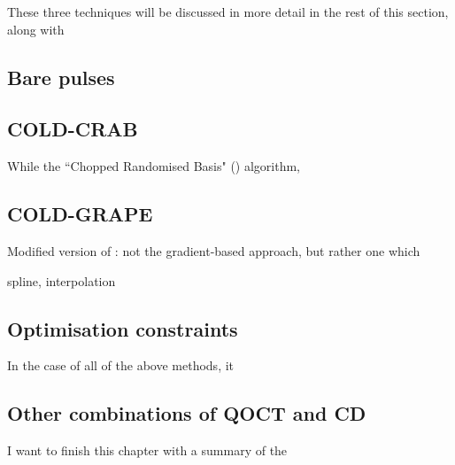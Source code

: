 These three techniques will be discussed in more detail in the rest of this section, along with 


\subsection{Bare pulses}

\subsection{COLD-CRAB}

While the ``Chopped Randomised Basis" () algorithm,


\subsection{COLD-GRAPE}

Modified version of : not the gradient-based approach, but rather one which 

spline, interpolation

\subsection{Optimisation constraints}

In the case of all of the above methods, it 

\subsection{Other combinations of QOCT and CD}

I want to finish this chapter with a summary of the 